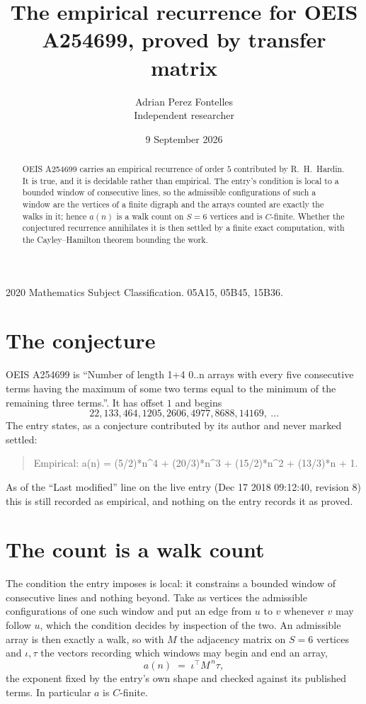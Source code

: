 \documentclass[11pt,a4paper]{article}
\title{The empirical recurrence for OEIS A254699, proved by transfer matrix}
\author{Adrian Perez Fontelles\\ \small Independent researcher}
\date{9 September 2026}
\theoremstyle{plain}
\theoremstyle{definition}
\begin{document}
\maketitle

\begin{abstract}
OEIS A254699 carries an empirical recurrence of order $5$ contributed by R.~H.~Hardin. It is
true, and it is decidable rather than empirical. The entry's condition is local to a bounded window of consecutive lines, so
the admissible configurations of such a window are the vertices of a finite digraph and the
arrays counted are exactly the walks in it; hence $a(n)$ is a walk count on $S=6$ vertices
and is $C$-finite. Whether the conjectured recurrence annihilates it is then settled by a
finite exact computation, with the Cayley--Hamilton theorem bounding the work.
\end{abstract}

\noindent\small 2020 Mathematics Subject Classification. 05A15, 05B45, 15B36.\normalsize

\section{The conjecture}

OEIS A254699 is ``Number of length 1+4 0..n arrays with every five consecutive terms having the maximum of some two terms equal to the minimum of the remaining three terms.''. It has offset $1$ and begins
\[
22, 133, 464, 1205, 2606, 4977, 8688, 14169,\ \dots
\]
The entry states, as a conjecture contributed by its author and never marked settled:
\begin{quote}
Empirical: a(n) = (5/2)*n\^{}4 + (20/3)*n\^{}3 + (15/2)*n\^{}2 + (13/3)*n + 1.
\end{quote}
As of the ``Last modified'' line on the live entry (Dec 17 2018 09:12:40, revision 8) this is still
recorded as empirical, and nothing on the entry records it as proved.

\section{The count is a walk count}

The condition the entry imposes is local: it constrains a bounded window of consecutive lines and nothing beyond. Take as
vertices the admissible configurations of one such window and put an edge from $u$ to $v$
whenever $v$ may follow $u$, which the condition decides by inspection of the two. An
admissible array is then exactly a walk, so with $M$ the adjacency matrix on $S=6$ vertices
and $\iota,\tau$ the vectors recording which windows may begin and end an array,
\[
a(n)\;=\;\iota^{\!\top}M^{\,n}\tau ,
\]
the exponent fixed by the entry's own shape and checked against its published terms. In
particular $a$ is $C$-finite.
\end{document}
